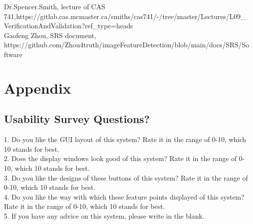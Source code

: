 \documentclass[12pt, titlepage]{article}
\begin{document}
\newpage

				



Dr.Spencer.Smith, lecture of CAS 741,https://gitlab.cas.mcmaster.ca/smiths/cas741/-/tree/master/Lectures/L09_VerificationAndValidation?ref_type=heads\\
Gaofeng Zhou, SRS  document, https://github.com/Zhou4truth/imageFeatureDetection/blob/main/docs/SRS/Software%

\newpage

\section{Appendix}

\subsection{Usability Survey Questions?}

1. Do you like the GUI layout of this system? Rate it in the range of 0-10, which 10 stands for best.\\
2. Does the display windows look good of this system? Rate it in the range of 0-10, which 10 stands for best.\\
3. Do you like the designs of these buttons of this system? Rate it in the range of 0-10, which 10 stands for best.\\
4. Do you like the way with which these feature points displayed of this system? Rate it in the range of 0-10, which 10 stands for best.\\
5. If you have any advice on this system, please write in the blank.\\

\newpage{}
\end{document}
